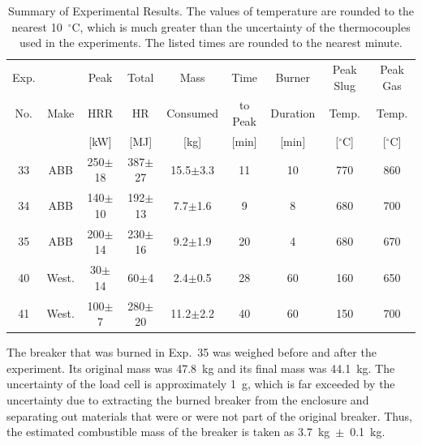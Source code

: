 \begin{table}[ht]
\begin{center}
\caption[Summary of Experimental Results]{Summary of Experimental Results. The values of temperature are rounded to the nearest 10~$^\circ$C, which is much greater than the uncertainty of the thermocouples used in the experiments. The listed times are rounded to the nearest minute.}
\label{matrix}
\begin{tabular}{|c|c|c|c|c|c|c|c|c|}
\hline
Exp.   &                & Peak           & Total      & Mass            & Time            & Burner       & Peak Slug    & Peak Gas      \\
No.    & Make           & HRR            & HR         & Consumed        & to Peak         & Duration     & Temp.        & Temp.         \\
       &                & [kW]           & [MJ]       & [kg]            & [min]           & [min]        & [$^\circ$C]  & [$^\circ$C]   \\ \hline
33     & ABB            & 250$\pm$18     & 387$\pm$27 & 15.5$\pm$3.3    & 11              & 10           & 770          & 860           \\ \hline
34     & ABB            & 140$\pm$10     & 192$\pm$13 & 7.7$\pm$1.6     & 9               & 8            & 680          & 700           \\ \hline
35     & ABB            & 200$\pm$14     & 230$\pm$16 & 9.2$\pm$1.9     & 20              & 4            & 680          & 670           \\ \hline
40     & West.          & 30$\pm$14      & 60$\pm$4   & 2.4$\pm$0.5     & 28              & 60           & 160          & 650           \\ \hline
41     & West.          & 100$\pm$7      & 280$\pm$20 & 11.2$\pm$2.2    & 40              & 60           & 150          & 700           \\ \hline
\end{tabular}
\end{center}
\end{table}

The breaker that was burned in Exp.~35 was weighed before and after the experiment. Its original mass was 47.8~kg and its final mass was 44.1~kg. The uncertainty of the load cell is approximately 1~g, which is far exceeded by the uncertainty due to extracting the burned breaker from the enclosure and separating out materials that were or were not part of the original breaker. Thus, the estimated combustible mass of the breaker is taken as 3.7~kg~$\pm$~0.1~kg.

